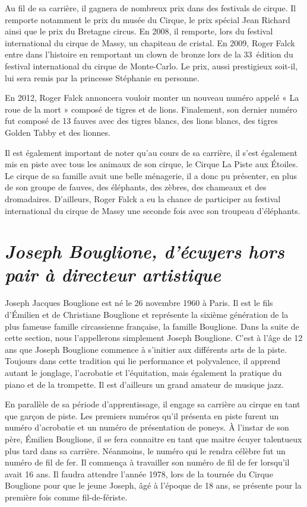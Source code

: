 Au fil de sa carrière, il gagnera de nombreux prix dans des festivals de cirque. Il remporte notamment le prix du musée du Cirque, le prix spécial Jean Richard ainsi que le prix du Bretagne circus. En 2008, il remporte, lors du festival international du cirque de Massy, un chapiteau de cristal.  En 2009, Roger Falck entre dans l’histoire en remportant un clown de bronze lors de la 33\ieme~édition du festival international du cirque de Monte-Carlo. Le prix, aussi prestigieux soit-il, lui sera remis par la princesse Stéphanie en personne.

En 2012, Roger Falck annoncera vouloir monter un nouveau numéro appelé « La roue de la mort » composé de tigres et de lions. Finalement, son dernier numéro fut composé de 13 fauves avec des tigres blancs, des lions blancs, des tigres Golden Tabby et des lionnes.

Il est également important de noter qu’au cours de sa carrière, il s’est également mis en piste avec tous les animaux de son cirque, le Cirque La Piste aux Étoiles. Le cirque de sa famille avait une belle ménagerie, il a donc pu présenter, en plus de son groupe de fauves, des éléphants, des zèbres, des chameaux et des dromadaires. D’ailleurs, Roger Falck a eu la chance de participer au festival international du cirque de Massy une seconde fois avec son troupeau d’éléphants.

\section*{\textit{Joseph Bouglione, d’écuyers hors pair à directeur artistique}}
{}
Joseph Jacques Bouglione est né le 26 novembre 1960 à Paris. Il est le fils d'Émilien et de Christiane Bouglione et représente la sixième génération de la plus fameuse famille circassienne française, la famille Bouglione. Dans la suite de cette section, nous l’appellerons simplement Joseph Bouglione. C’est à l’âge de 12 ans que Joseph Bouglione commence à s’initier aux différents arts de la piste. Toujours dans cette tradition qui lie performance et polyvalence, il apprend autant le jonglage, l’acrobatie et l’équitation, mais également la pratique du piano et de la trompette. Il est d’ailleurs un grand amateur de musique jazz.

En parallèle de sa période d’apprentissage, il engage sa carrière au cirque en tant que garçon de piste. Les premiers numéros qu’il présenta en piste furent un numéro d’acrobatie et un numéro de présentation de poneys. À l’instar de son père, Émilien Bouglione, il se fera connaitre en tant que maitre écuyer talentueux plus tard dans sa carrière. Néanmoins, le numéro qui le rendra célèbre fut un numéro de fil de fer. Il commença à travailler son numéro de fil de fer lorsqu’il avait 16 ans. Il faudra attendre l’année 1978, lors de la tournée du Cirque Bouglione pour que le jeune Joseph, âgé à l’époque de 18 ans, se présente pour la première fois comme fil-de-fériste.

